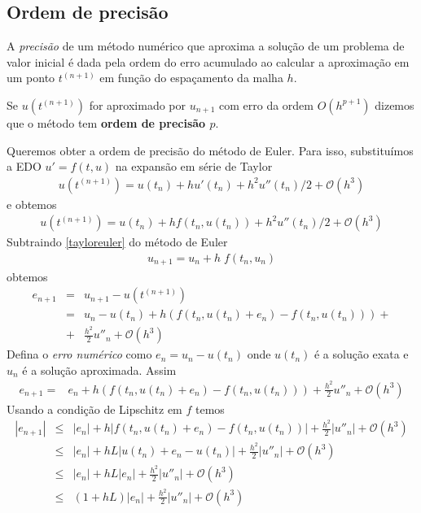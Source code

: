 \subsection{Ordem de precisão}




A \emph{precisão} de um método numérico que aproxima a solução de um problema de valor inicial é dada pela ordem do erro acumulado ao calcular a aproximação em um ponto $t^{(n+1)}$ em função do espaçamento da malha $h$.

Se $u(t^{(n+1)})$ for aproximado por $u_{n+1}$ com erro da ordem $O(h^{p+1})$ dizemos que o método tem \textbf{ordem de precisão $p$}.


Queremos obter a ordem de precisão do método de Euler. Para isso, substituímos a EDO $u'=f(t,u)$ na expansão em série de Taylor
\begin{eqnarray}\label{taylor}
   u(t^{(n+1)})=u(t_n)+hu'(t_n)+h^2u''(t_n)/2+ \mathcal O(h^3)
\end{eqnarray}
e obtemos
\begin{eqnarray}\label{tayloreuler}
 u(t^{(n+1)})=u(t_n)+hf(t_n,u(t_n))+h^2u''(t_n)/2+ \mathcal O(h^3)
\end{eqnarray}
Subtraindo \eqref{tayloreuler} do método de Euler
\begin{eqnarray}
    u_{n+1}=u_n + h\;f(t_n,u_n)
\end{eqnarray}
obtemos
\begin{eqnarray}
   e_{n+1}   &=& u_{n+1}-u(t^{(n+1)}) \\
             &=&u_n - u(t_n)  +h(f(t_n,u(t_n)+e_n)- f(t_n,u(t_n))) +\\
             &+&\frac{h^2}{2}u''_n+\mathcal O(h^3)
\end{eqnarray}
Defina o \emph{erro numérico} como $e_n=u_n-u(t_n)$ onde $u(t_n)$ é a solução exata e $u_n$ é a solução aproximada. Assim
\begin{eqnarray}
   e_{n+1}    =&e_n + h(f(t_n,u(t_n)+e_n)- f(t_n,u(t_n))) +\frac{h^2}{2}u''_n+\mathcal O(h^3)
\end{eqnarray}
Usando a condição de Lipschitz em $f$  temos
\begin{eqnarray}
   |e_{n+1}|      &\le &  |e_n| + h|f(t_n,u(t_n)+e_n)- f(t_n,u(t_n))|+\frac{h^2}{2}|u''_n|+\mathcal O(h^3)\\
                  &\le &  |e_n| + hL |u(t_n)+e_n- u(t_n)|+\frac{h^2}{2}|u''_n|+\mathcal O(h^3)\\
                  &\le &  |e_n| + hL |e_n|+\frac{h^2}{2}|u''_n|+\mathcal O(h^3)\\
                  &\le &  (1+ hL) |e_n|+\frac{h^2}{2}|u''_n|+\mathcal O(h^3)
\end{eqnarray}

